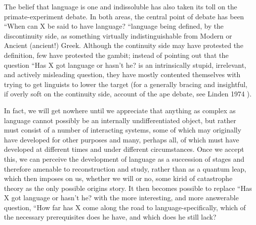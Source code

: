 The belief that language is one and indissoluble has also taken its toll on the primate-experiment debate. In both areas, the central point of debate has been ``When can X be said to have language?{\textquotedbl}\- ``language being defined, by the discontinuity side, as something virtually indistinguishable from Modern  or Ancient (ancient!) Greek. Although the continuity side may have protested the definition, few have protested the gambit; instead of pointing out that the ques\-tion ``Has X got language or hasn't he? is an intrinsically stupid, irrelevant, and actively misleading question, they have mostly con\-tented themselves with trying to get linguists to lower the target (for a generally bracing and insightful, if overly soft on the continuity side, account of the ape debate, see Linden 1974 ).

In fact, we will get nowhere until we appreciate that anything as complex as language cannot possibly be an internally undifferenti\-ated object, but rather must consist of a number of interacting systems,
some of which may originally have developed for other purposes and many, perhaps all, of which must have developed at different times and under different circumstances. Once we accept this, we can per\-ceive the development of language as a succession of stages and there\-fore amenable to reconstruction and study, rather than as a quantum leap, which then imposes on us, whether we will or no, some kirid of catastrophe theory as the only possible origins story. It then becomes possible to replace ``Has X got language or hasn't he? with the more interesting, and more answerable question, ``How far has X come along the road to language-specifically, which of the necessary pre\-requisites does he have, and which does he still lack?{\textquotedbl}

